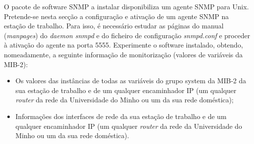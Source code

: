 \documentclass[../momento_1.tex]{subfiles}
\begin{document}
O pacote de software SNMP a instalar disponibiliza um agente SNMP para Unix. Pretende-se
nesta secção a configuração e ativação de um agente SNMP na estação de trabalho. Para isso, é necessário estudar as páginas do manual (\textit{manpages}) do \textit{daemon snmpd} e do ficheiro de configuração \textit{snmpd.conf} e proceder à ativação do agente na porta 5555.
Experimente o software instalado, obtendo, nomeadamente, a seguinte informação de monitorização
(valores de variáveis da MIB-2):

\begin{itemize}
\item  Os valores das instâncias de todas as variáveis do grupo system da MIB-2 da sua estação de
trabalho e de um qualquer encaminhador IP (um qualquer \textit{router} da rede da Universidade do
Minho ou um da sua rede doméstica);
\item Informações dos interfaces de rede da sua estação de trabalho e de um qualquer encaminhador
IP (um qualquer \textit{router} da rede da Universidade do Minho ou um da sua rede doméstica).
\end{itemize}
\end{document}
